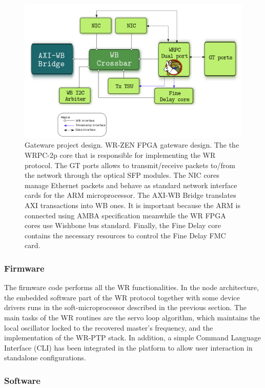 \begin{figure}[H] \centering
	\includegraphics[scale=0.4]{img/gateware_first_level} \caption{Gateware
	project design. WR-ZEN FPGA gateware design. The the WRPC-2p core that is responsible for implementing the WR protocol. The GT ports allows to transmit/receive packets to/from the network through the optical SFP modules. The NIC cores manage Ethernet packets and behave as standard network interface cards for the ARM microprocessor. The AXI-WB Bridge translates AXI transactions into WB ones. It is important because the ARM is connected using AMBA specification meanwhile the WR FPGA cores use Wishbone bus standard. Finally, the Fine Delay core contains the necessary resources to control the Fine Delay FMC card.} \label{fig:gateware_first_level} 
\end{figure}

\subsubsection{Firmware} \label{subsec:firmware}

The firmware code performs all the WR functionalities. 
In the node architecture, the embedded software part of the WR protocol together with some device drivers runs in the soft-microprocessor described in the previous section. The main tasks of the WR routines are the servo loop algorithm, which maintains the local oscillator locked to the recovered master's frequency, and the implementation of the WR-PTP stack. In addition, a simple Command Language Interface (CLI) has been integrated in the platform to allow user interaction in standalone configurations.

\subsubsection{Software} \label{subsec:software}

